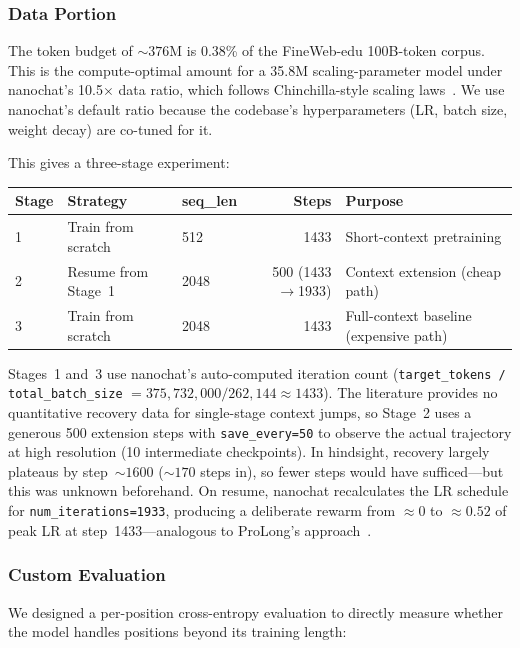 \documentclass[11pt]{article}
\begin{document}
\subsubsection{Data Portion}

The token budget of ${\sim}376$M is 0.38\% of the FineWeb-edu 100B-token corpus. This is the compute-optimal amount for a 35.8M scaling-parameter model under nanochat's 10.5$\times$ data ratio, which follows Chinchilla-style scaling laws~\cite{chinchilla}. We use nanochat's default ratio because the codebase's hyperparameters (LR, batch size, weight decay) are co-tuned for it.

This gives a three-stage experiment:

\begin{table}[H]
\centering\small
\begin{tabular}{@{}lllrl@{}}
\toprule
Stage & Strategy & seq\_len & Steps & Purpose \\
\midrule
1 & Train from scratch & 512 & 1433 & Short-context pretraining \\
2 & Resume from Stage~1 & 2048 & 500 (1433$\to$1933) & Context extension (cheap path) \\
3 & Train from scratch & 2048 & 1433 & Full-context baseline (expensive path) \\
\bottomrule
\end{tabular}
\end{table}

Stages~1 and~3 use nanochat's auto-computed iteration count (\texttt{target\_tokens / total\_batch\_size} $= 375{,}732{,}000 / 262{,}144 \approx 1433$). The literature provides no quantitative recovery data for single-stage context jumps, so Stage~2 uses a generous 500 extension steps with \texttt{save\_every=50} to observe the actual trajectory at high resolution (10 intermediate checkpoints). In hindsight, recovery largely plateaus by step~${\sim}1600$ (${\sim}170$ steps in), so fewer steps would have sufficed---but this was unknown beforehand. On resume, nanochat recalculates the LR schedule for \texttt{num\_iterations=1933}, producing a deliberate rewarm from ${\approx}0$ to ${\approx}0.52$ of peak LR at step~1433---analogous to ProLong's approach~\cite{prolong}.

\subsubsection{Custom Evaluation}

We designed a per-position cross-entropy evaluation to directly measure whether the model handles positions beyond its training length:
\end{document}
